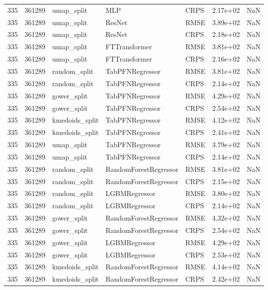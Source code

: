 \begin{tabular}{rrlllrr}
335 & 361289 & umap\_split & MLP & CRPS & 2.17e+02 & NaN \\
335 & 361289 & umap\_split & ResNet & RMSE & 3.89e+02 & NaN \\
335 & 361289 & umap\_split & ResNet & CRPS & 2.18e+02 & NaN \\
335 & 361289 & umap\_split & FTTransformer & RMSE & 3.81e+02 & NaN \\
335 & 361289 & umap\_split & FTTransformer & CRPS & 2.16e+02 & NaN \\
335 & 361289 & random\_split & TabPFNRegressor & RMSE & 3.81e+02 & NaN \\
335 & 361289 & random\_split & TabPFNRegressor & CRPS & 2.14e+02 & NaN \\
335 & 361289 & gower\_split & TabPFNRegressor & RMSE & 4.29e+02 & NaN \\
335 & 361289 & gower\_split & TabPFNRegressor & CRPS & 2.54e+02 & NaN \\
335 & 361289 & kmedoids\_split & TabPFNRegressor & RMSE & 4.12e+02 & NaN \\
335 & 361289 & kmedoids\_split & TabPFNRegressor & CRPS & 2.41e+02 & NaN \\
335 & 361289 & umap\_split & TabPFNRegressor & RMSE & 3.79e+02 & NaN \\
335 & 361289 & umap\_split & TabPFNRegressor & CRPS & 2.14e+02 & NaN \\
335 & 361289 & random\_split & RandomForestRegressor & RMSE & 3.81e+02 & NaN \\
335 & 361289 & random\_split & RandomForestRegressor & CRPS & 2.15e+02 & NaN \\
335 & 361289 & random\_split & LGBMRegressor & RMSE & 3.80e+02 & NaN \\
335 & 361289 & random\_split & LGBMRegressor & CRPS & 2.14e+02 & NaN \\
335 & 361289 & gower\_split & RandomForestRegressor & RMSE & 4.32e+02 & NaN \\
335 & 361289 & gower\_split & RandomForestRegressor & CRPS & 2.54e+02 & NaN \\
335 & 361289 & gower\_split & LGBMRegressor & RMSE & 4.29e+02 & NaN \\
335 & 361289 & gower\_split & LGBMRegressor & CRPS & 2.53e+02 & NaN \\
335 & 361289 & kmedoids\_split & RandomForestRegressor & RMSE & 4.14e+02 & NaN \\
335 & 361289 & kmedoids\_split & RandomForestRegressor & CRPS & 2.42e+02 & NaN \\

\end{tabular}
